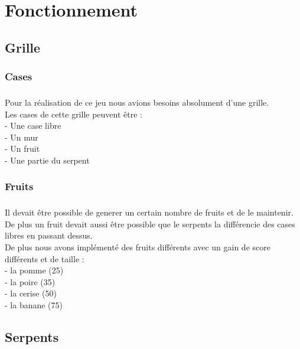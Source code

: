 \documentclass{beamer}
\begin{document}
\section{Fonctionnement}
\subsection{Grille}
\subsubsection{Cases}
\begin{frame}
\frametitle{\insertsubsubsection}
\framesubtitle{\insertsubsection}
\framesubsubtitle{\insertsection}
Pour la réalisation de ce jeu nous avions besoins absolument d'une grille.\\
Les cases de cette grille peuvent être :\\
\indent - Une case libre\\
\indent - Un mur\\
\indent - Un fruit\\
\indent - Une partie du serpent

\end{frame}
\subsubsection{Fruits}
\begin{frame}
\frametitle{\insertsubsubsection}
\framesubtitle{\insertsubsection}
\framesubsubtitle{\insertsection}
Il devait être possible de generer un certain nombre de fruits et de le maintenir.\\
De plus un fruit devait aussi être possible que le serpents la différencie des cases libres en passant dessus.\\
De plus nous avons implémenté des fruits différents avec un gain de score différents et de taille :\\
\indent - la pomme  (25)\\
\indent - la poire  (35)\\
\indent - la cerise (50)\\
\indent - la banane (75)

\end{frame}
\subsection{Serpents}
\end{document}
